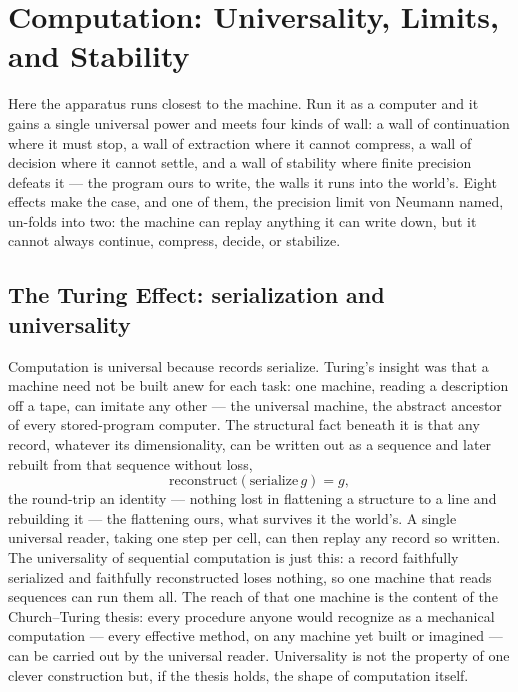 \chapter{Computation: Universality, Limits, and Stability}
\label{chap:computation-universality-limits-stability}

Here the apparatus runs closest to the machine. Run it as a computer and it
gains a single universal power and meets four kinds of wall: a wall of continuation where it must stop, a wall
of extraction where it cannot compress, a wall of decision where it cannot settle, and a wall of stability
where finite precision defeats it --- the program ours to write, the walls it runs into the world's. Eight
effects make the case, and one of them, the precision limit von
Neumann named, un-folds into two: the machine can replay anything it can write down, but it cannot always
continue, compress, decide, or stabilize.

\section{The Turing Effect: serialization and universality}
\label{se:turing}

Computation is universal because records serialize. Turing's insight was that a machine need not be built anew
for each task: one machine, reading a description off a tape, can imitate any other --- the universal machine,
the abstract ancestor of every stored-program computer. The structural fact beneath it is that any record,
whatever its dimensionality, can be written out as a sequence and later rebuilt from that sequence without
loss,
\begin{equation}
  \text{reconstruct}(\text{serialize}\, g) = g,
\end{equation}
the round-trip an identity --- nothing lost in flattening a structure to a line and rebuilding it --- the
flattening ours, what survives it the world's. A single
universal reader, taking one step per cell, can then replay any record so written. The universality of
sequential computation is just this: a record faithfully serialized and faithfully reconstructed loses nothing,
so one machine that reads sequences can run them all. The reach of that one machine is the content of the
Church--Turing thesis: every procedure anyone would recognize as a mechanical computation --- every effective
method, on any machine yet built or imagined --- can be carried out by the universal reader. Universality is not
the property of one clever construction but, if the thesis holds, the shape of computation itself.

